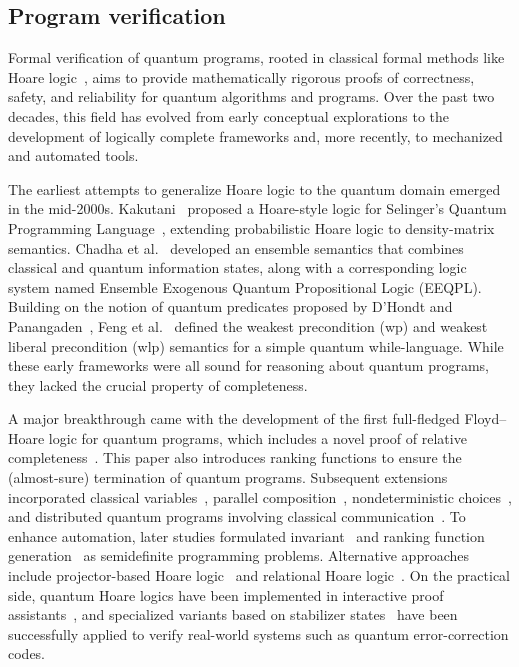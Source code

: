 \documentclass[a4paper,onecolumn,11pt,unpublished]{quantumarticle}
\begin{document}
\subsection{Program verification}
Formal verification of quantum programs, rooted in classical formal methods like Hoare logic~\cite{Hoare1969axiomatic,Reynolds1998PL}, aims to provide mathematically rigorous proofs of correctness, safety, and reliability for quantum algorithms and programs.
Over the past two decades, this field has evolved from early conceptual explorations to the development of logically complete frameworks and, more recently, to mechanized and automated tools.

The earliest attempts to generalize Hoare logic to the quantum domain emerged in the mid-2000s. Kakutani~\cite{Kakutani2009logic} proposed a Hoare-style logic for Selinger's Quantum Programming Language~\cite{Selinger04Towards}, extending probabilistic Hoare logic to density-matrix semantics. Chadha et al.~\cite{Chadha2006Reasoning} developed an ensemble semantics that combines classical and quantum information states, along with a corresponding logic system named Ensemble Exogenous Quantum Propositional Logic (EEQPL).
Building on the notion of quantum predicates proposed by D'Hondt and Panangaden~\cite{DHondt2006wlp}, Feng et al.~\cite{Feng2007proofrules} defined the weakest precondition (wp) and weakest liberal precondition (wlp) semantics for a simple quantum while-language. While these early frameworks were all sound for reasoning about quantum programs, they lacked the crucial property of completeness.

A major breakthrough came with the development of the first full-fledged Floyd–Hoare logic for quantum programs, which includes a novel proof of relative completeness~\cite{YingQHL2012}. This paper also introduces ranking functions to ensure the (almost-sure) termination of quantum programs. Subsequent extensions incorporated classical variables~\cite{FengQHL2021}, parallel composition~\cite{ying2022proof}, nondeterministic choices~\cite{feng2023verification}, and distributed quantum programs involving classical communication~\cite{feng2022verification}. To enhance automation, later studies formulated invariant~\cite{ying2017invariants} and ranking function generation~\cite{li2018algorithmic} as semidefinite programming problems. Alternative approaches include projector-based Hoare logic~\cite{Zhouapplied2019} and relational Hoare logic~\cite{barthe2019relational, Dominique2019qrhl}.
On the practical side, quantum Hoare logics have been implemented in interactive proof assistants~\cite{ZhouCoqq2023, Rand_2018, CharetonQbricks2020, LiuQHLprover2019}, and specialized variants based on stabilizer states~\cite{huang2025} have been successfully applied to verify real-world systems such as quantum error-correction codes. 
\end{document}
